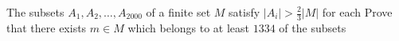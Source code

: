 The subsets $A_1,A_2,\ldots ,A_{2000}$ of a finite set $M$ satisfy $|A_i|>\frac{2}{3}|M|$ for each  Prove that there exists $m\in M$ which belongs to at least $1334$ of the subsets 